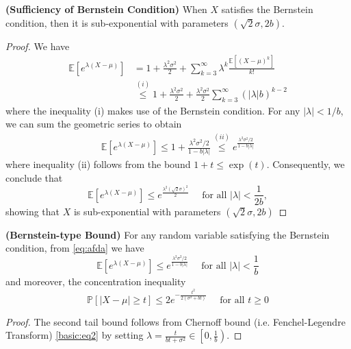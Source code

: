 \documentclass{article}
\newcommand{\bfs}[1]{\textbf{({#1})}}
\begin{document}
\begin{thma}{\bfs{Sufficiency of Bernstein Condition}}
When $X$ satisfies the Bernstein condition, then it is sub-exponential with parameters $(\sqrt{2} \sigma, 2 b)$.
\end{thma}
\begin{proof}
We have
\begin{align*}
\mathbb{E}\left[e^{\lambda(X-\mu)}\right] &=1+\frac{\lambda^{2} \sigma^{2}}{2}+\sum_{k=3}^{\infty} \lambda^{k} \frac{\mathbb{E}\left[(X-\mu)^{k}\right]}{k !} \\
&\stackrel{(i)}{\leq} 1+\frac{\lambda^{2} \sigma^{2}}{2}+\frac{\lambda^{2} \sigma^{2}}{2} \sum_{k=3}^{\infty}(|\lambda| b)^{k-2}
\end{align*}
where the inequality (i) makes use of the Bernstein condition. For any $|\lambda|<1 / b$, we can sum the geometric series to obtain
\begin{align}
    \mathbb{E}\left[e^{\lambda(X-\mu)}\right] \leq 1+\frac{\lambda^{2} \sigma^{2} / 2}{1-b|\lambda|} \stackrel{(i i)}{\leq} e^{\frac{\lambda^{2} \sigma^{2} / 2}{1-b|\lambda|}}\label{eq:afda}
\end{align}
where inequality (ii) follows from the bound $1+t \leq \exp (t)$. Consequently, we conclude that
$$
\mathbb{E}\left[e^{\lambda(X-\mu)}\right] \leq e^{\frac{\lambda^{2}(\sqrt{2} \sigma)^{2}}{2}} \quad \text { for all }|\lambda|<\frac{1}{2 b},
$$
showing that $X$ is sub-exponential with parameters $(\sqrt{2} \sigma, 2 b)$
\end{proof}
\begin{thma}{\bfs{Bernstein-type Bound}}\label{thmBernstein}
For any random variable satisfying the Bernstein condition, from \cref{eq:afda} we have
$$
\mathbb{E}\left[e^{\lambda(X-\mu)}\right] \leq e^{\frac{\lambda^{2} \sigma^{2} / 2}{1-b|\lambda|}} \quad \text { for all }|\lambda|<\frac{1}{b}
$$
and moreover, the concentration inequality
$$
\mathbb{P}[|X-\mu| \geq t] \leq 2 e^{-\frac{t^{2}}{2\left(\sigma^{2}+b t\right)}} \quad \text { for all } t \geq 0
$$
\end{thma}
\begin{proof}
The second tail bound follows from Chernoff bound (i.e. Fenchel-Legendre Transform) \cref{basic:eq2} by setting $\lambda=\frac{t}{b t+\sigma^{2}} \in\left[0, \frac{1}{b}\right)$.
\end{proof}
\end{document}
